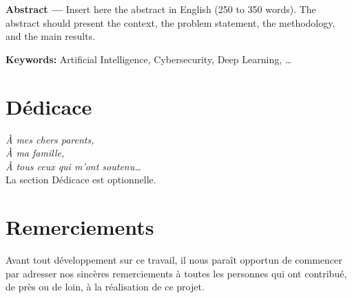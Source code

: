 \documentclass[12pt, a4paper, oneside]{report}
\begin{document}
\begin{tcolorbox}[colback=iacsLight!30, colframe=iacsPrimary, boxrule=0.5pt, arc=3pt]
  \textbf{Abstract ---}
  Insert here the abstract in English (250 to 350 words). The abstract should present the context, the problem statement, the methodology, and the main results.

  \vspace{6pt}
  \textbf{Keywords:} Artificial Intelligence, Cybersecurity, Deep Learning, \ldots
\end{tcolorbox}

\newpage


\chapter*{Dédicace}
\thispagestyle{empty}

\vspace*{4cm}
\begin{flushright}
  \begin{minipage}{0.6\textwidth}
    \begin{flushright}
      {\large\itshape\color{iacsSecondary}
        À mes chers parents,\\[4pt]
        À ma famille,\\[4pt]
        À tous ceux qui m'ont soutenu\ldots\\[20pt]
      }
      {\normalsize\color{iacsGray}
        La section Dédicace est optionnelle.
      }
    \end{flushright}
  \end{minipage}
\end{flushright}

\newpage


\chapter*{Remerciements}

Avant tout développement sur ce travail, il nous paraît opportun de commencer par adresser nos sincères remerciements à toutes les personnes qui ont contribué, de près ou de loin, à la réalisation de ce projet.
\end{document}
